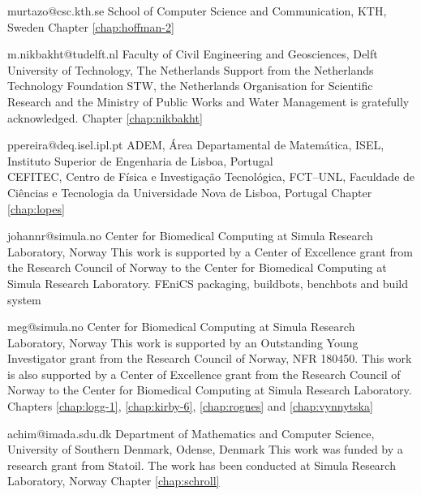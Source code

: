              {murtazo@csc.kth.se}
             {School of Computer Science and Communication, KTH, Sweden}
             {}
             {Chapter \ref{chap:hoffman-2}}

             {m.nikbakht@tudelft.nl}
             {Faculty of Civil Engineering and Geosciences,
             Delft University of Technology, The Netherlands}
             {Support from the Netherlands Technology Foundation STW,
              the Netherlands Organisation for Scientific Research
              and the Ministry of Public Works and Water Management is
              gratefully acknowledged.}
             {Chapter \ref{chap:nikbakht}}

             {ppereira@deq.isel.ipl.pt}
             {ADEM, \'{A}rea Departamental de Matem\'{a}tica,
              ISEL, Instituto Superior de Engenharia de Lisboa, Portugal \\
              CEFITEC, Centro de F\'{i}sica e Investiga\c{c}\~ao Tecnol\'{o}gica, FCT--UNL,
              Faculdade de Ci\^{e}ncias e Tecnologia da Universidade Nova de Lisboa, Portugal}
             {}
             {Chapter \ref{chap:lopes}}

             {johannr@simula.no}
             {Center for Biomedical Computing at Simula Research Laboratory, Norway}
             {This work is supported by a Center of Excellence grant
              from the Research Council of Norway to the Center for
              Biomedical Computing at Simula Research Laboratory.}
             {FEniCS packaging, buildbots, benchbots and build system}

             {meg@simula.no}
             {Center for Biomedical Computing at Simula Research Laboratory, Norway}
             {This work is supported by an Outstanding Young
              Investigator grant from the Research Council of Norway,
              NFR 180450. This work is also supported by a Center of
              Excellence grant from the Research Council of Norway to
              the Center for Biomedical Computing at Simula Research
              Laboratory.}
             {Chapters
              \ref{chap:logg-1}, \ref{chap:kirby-6}, \ref{chap:rognes} and \ref{chap:vynnytska}}

             {achim@imada.sdu.dk}
             {Department of Mathematics and Computer Science, University of Southern Denmark, Odense, Denmark}
             {This work was funded by a research grant from Statoil.
              The work has been conducted at Simula Research Laboratory, Norway}
             {Chapter \ref{chap:schroll}}

